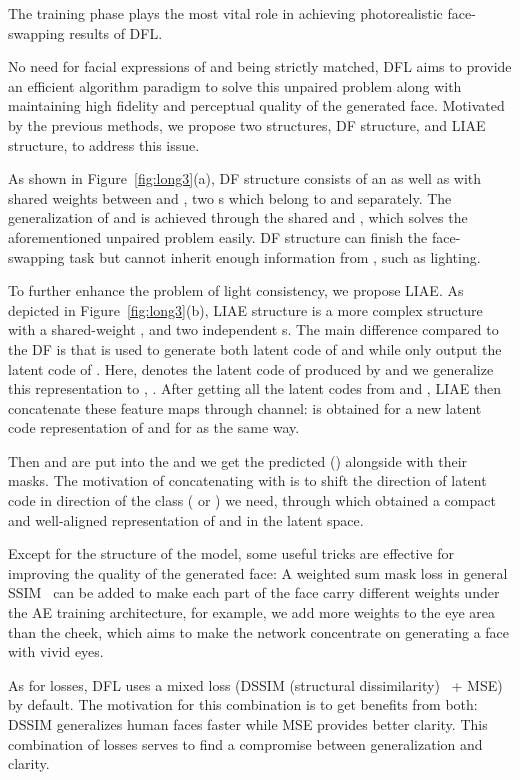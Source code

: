 \documentclass[10pt,twocolumn,letterpaper]{article}
\begin{document}
The training phase plays the most vital role in achieving photorealistic face-swapping results of DFL.

No need for facial expressions of   and   being strictly matched, DFL aims to provide an efficient algorithm paradigm to solve this unpaired problem along with maintaining high fidelity and perceptual quality of the generated face. Motivated by the previous methods, we propose two structures, DF structure, and LIAE structure, to address this issue.

As shown in Figure~\ref{fig:long3}(a), DF structure consists of an  as well as  with shared weights between  and , two s which belong to  and  separately. The generalization of  and  is achieved through the shared  and , which solves the aforementioned unpaired problem easily. DF structure can finish the face-swapping task but cannot inherit enough information from , such as lighting. 

To further enhance the problem of light consistency, we propose LIAE.
As depicted in Figure~\ref{fig:long3}(b), LIAE structure is a more complex structure with a shared-weight ,  and two independent s. The main difference compared to the DF is that  is used to generate both latent code of  and  while  only output the latent code of . Here,  denotes the latent code of  produced by  and we generalize this representation to , .
After getting all the latent codes from  and , LIAE then concatenate these feature maps through channel:  is obtained for a new latent code representation of  and  for  as the same way. 

Then  and  are put into the  and we get the predicted  () alongside with their masks. The motivation of concatenating  with  is to shift the direction of latent code in direction of the class ( or ) we need, through which  obtained a compact and well-aligned representation of  and  in the latent space.

Except for the structure of the model, some useful tricks are effective for improving the quality of the generated face: A weighted sum mask loss in general SSIM~\cite{wang2004image} can be added to make each part of the face carry different weights under the AE training architecture, for example, we add more weights to the eye area than the cheek, which aims to make the network concentrate on generating a face with vivid eyes.

As for losses, DFL uses a mixed loss (DSSIM (structural dissimilarity)~\cite{loza2006structural} + MSE) by default. The motivation for this combination is to get benefits from both: DSSIM generalizes human faces faster while MSE provides better clarity. This combination of losses serves to find a compromise between generalization and clarity.
\end{document}

